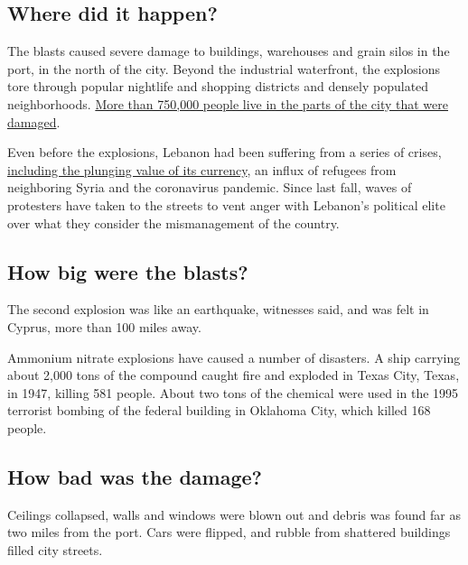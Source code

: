\hypertarget{where-did-it-happen}{%
\subsection{Where did it happen?}\label{where-did-it-happen}}

The blasts caused severe damage to buildings, warehouses and grain silos
in the port, in the north of the city. Beyond the industrial waterfront,
the explosions tore through popular nightlife and shopping districts and
densely populated neighborhoods.
\href{https://www.nytimes3xbfgragh.onion/interactive/2020/08/04/world/middleeast/beirut-explosion-damage.html}{More
than 750,000 people live in the parts of the city that were damaged}.

Even before the explosions, Lebanon had been suffering from a series of
crises,
\href{https://www.nytimes3xbfgragh.onion/2020/06/11/world/middleeast/lebanon-protests.html}{including
the plunging value of its currency}, an influx of refugees from
neighboring Syria and the coronavirus pandemic. Since last fall, waves
of protesters have taken to the streets to vent anger with Lebanon's
political elite over what they consider the mismanagement of the
country.

\hypertarget{how-big-were-the-blasts}{%
\subsection{How big were the blasts?}\label{how-big-were-the-blasts}}

The second explosion was like an earthquake, witnesses said, and was
felt in Cyprus, more than 100 miles away.

Ammonium nitrate explosions have caused a number of disasters. A ship
carrying about 2,000 tons of the compound caught fire and exploded in
Texas City, Texas, in 1947, killing 581 people. About two tons of the
chemical were used in the 1995 terrorist bombing of the federal building
in Oklahoma City, which killed 168 people.

\hypertarget{how-bad-was-the-damage}{%
\subsection{How bad was the damage?}\label{how-bad-was-the-damage}}

Ceilings collapsed, walls and windows were blown out and debris was
found far as two miles from the port. Cars were flipped, and rubble from
shattered buildings filled city streets.

